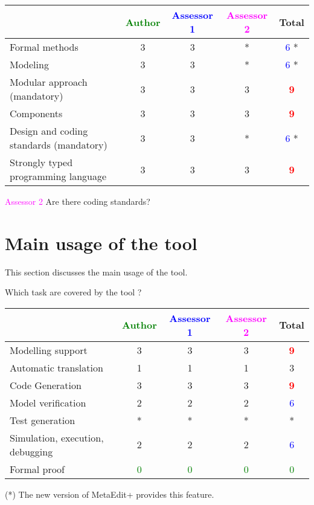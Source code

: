 \begin{tabular}{|l | c | c | c | c|}
\hline
& \textcolor{green}{Author} & \textcolor{blue}{Assessor 1} & \textcolor{magenta}{Assessor 2} & Total \\
\hline
Formal methods  &3 &3 & * & \textcolor{blue}{6} * \\
\hline 
Modeling  &3 &3 & * & \textcolor{blue}{6} * \\
\hline
Modular approach (mandatory) &3 &3 & 3   & \textcolor{red}{\textbf{9}} \\
\hline
Components &3 &3 & 3   & \textcolor{red}{\textbf{9}} \\
\hline
Design and coding standards (mandatory) &3 &3 & *& \textcolor{blue}{6} * \\
\hline
Strongly typed programming language &3 &3 & 3   & \textcolor{red}{\textbf{9}} \\
\hline

\end{tabular}

\textcolor{magenta}{Assessor 2} Are there coding standards?

\section{Main usage of the tool}
\label{main_usage}

This section discusses the main usage of the tool.

Which task are covered by the tool ?


\begin{tabular}{|l | c | c | c | c|}
\hline
& \textcolor{green}{Author} & \textcolor{blue}{Assessor 1} & \textcolor{magenta}{Assessor 2} & Total \\
\hline 
Modelling support &3 &3 & 3   & \textcolor{red}{\textbf{9}} \\
\hline
Automatic translation  &1 &1 & 1   & 3    \\
\hline
Code Generation  &3 &3 & 3   & \textcolor{red}{\textbf{9}} \\
\hline
Model verification &2 &2 & 2   & \textcolor{blue}{6} \\
\hline
Test generation &* &* & *& * \\
\hline
Simulation, execution, debugging &2 &2 & 2   & \textcolor{blue}{6} \\
\hline
Formal proof & \textcolor{green}{0}   & \textcolor{green}{0}   & \textcolor{green}{0} & \textcolor{green}{0} \\
\hline
\end{tabular}
\begin{author_comment}
(*) The new version of MetaEdit+ provides this feature.
\end{author_comment}

